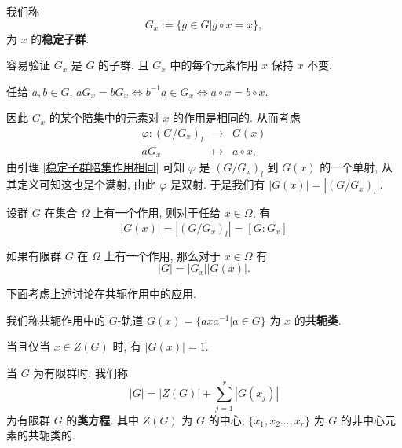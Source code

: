 \begin{definition}\label{稳定子群}
	我们称 $$G_x:=\{g\in G|g\circ x=x\},$$ 为 $x$ 的\textbf{稳定子群}.

	容易验证 $G_x$ 是 $G$ 的子群. 且 $G_x$ 中的每个元素作用 $x$ 保持 $x$ 不变.
\end{definition}

\begin{lemma}\label{稳定子群陪集作用相同}
	任给 $a,b\in G$, $aG_x=bG_x\Leftrightarrow b^{-1}a\in G_x\Leftrightarrow a\circ x=b\circ x$.
\end{lemma}

因此 $G_x$ 的某个陪集中的元素对 $x$ 的作用是相同的. 从而考虑
$$
\begin{array}{rcl}
	\varphi:(G/G_x)_l & \to & G(x)\\
	aG_x & \mapsto & a\circ x,
\end{array}
$$
由引理 \ref{稳定子群陪集作用相同} 可知 $\varphi$ 是 $(G/G_x)_l$ 到 $G(x)$ 的一个单射, 从其定义可知这也是个满射, 由此 $\varphi$ 是双射. 于是我们有 $|G(x)|=|(G/G_x)_l|$.

\begin{theorem}[轨道-稳定子定理]\label{轨道-稳定子定理}
	设群 $G$ 在集合 $\Omega$ 上有一个作用, 则对于任给 $x\in\Omega$, 有
	\begin{equation}
		|G(x)|=|(G/G_x)_l|=[G:G_x]
	\end{equation}
\end{theorem}

\begin{corollary}
	如果有限群 $G$ 在 $\Omega$ 上有一个作用, 那么对于 $x\in \Omega$ 有 $$|G|=|G_x||G(x)|.$$
\end{corollary}

下面考虑上述讨论在共轭作用中的应用.

\begin{definition}\label{共轭类}
	我们称共轭作用中的 $G$-轨道 $G(x)=\{axa^{-1}|a\in G\}$ 为 $x$ 的\textbf{共轭类}.
\end{definition}

当且仅当 $x\in Z(G)$ 时, 有 $|G(x)|=1$.

\begin{definition}\label{类方程}
	当 $G$ 为有限群时, 我们称
	\begin{equation}
		|G|=|Z(G)|+\sum\limits_{j=1}^r|G(x_j)|
	\end{equation}
	为有限群 $G$ 的\textbf{类方程}. 其中 $Z(G)$ 为 $G$ 的中心, $\{x_1,x_2\ldots,x_r\}$ 为 $G$ 的非中心元素的共轭类的.
\end{definition}

